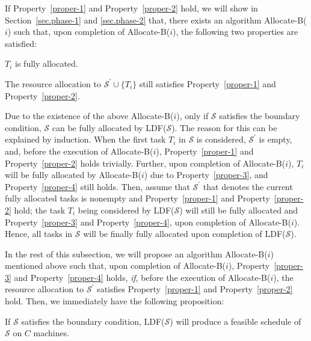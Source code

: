 \documentclass[10pt,journal,compsoc]{IEEEtran}
\begin{document}
If Property~\ref{proper-1} and Property~\ref{proper-2} hold, we will show in Section~\ref{sec.phase-1} and \ref{sec.phase-2} that, there exists an algorithm Allocate-B($i$) such that, upon completion of Allocate-B($i$), the following two properties are satisfied:

\begin{property}\label{proper-3}
$T_{i}$ is fully allocated.
\end{property}

\begin{property}\label{proper-4}
The resource allocation to $\mathcal{S}^{\prime}\cup\{T_{i}\}$ still satisfies Property~\ref{proper-1} and Property~\ref{proper-2}.
\end{property}
Due to the existence of the above Allocate-B($i$), only if $\mathcal{S}$ satisfies the boundary condition, $\mathcal{S}$ can be fully allocated by LDF($\mathcal{S}$). The reason for this can be explained by induction. When the first task $T_{i}$ in $\mathcal{S}$ is considered, $\mathcal{S}^{\prime}$ is empty, and, before the execution of Allocate-B($i$), Property~\ref{proper-1} and Property~\ref{proper-2} holds trivially. Further, upon completion of Allocate-B($i$), $T_{i}$ will be fully allocated by Allocate-B($i$) due to Property~\ref{proper-3}, and Property~\ref{proper-4} still holds. Then, assume that $\mathcal{S}^{\prime}$ that denotes the current fully allocated tasks is nonempty and Property~\ref{proper-1} and Property~\ref{proper-2} hold; the task $T_{i}$ being considered by LDF($\mathcal{S}$) will still be fully allocated and Property~\ref{proper-3} and Property~\ref{proper-4}, upon completion of Allocate-B($i$). Hence, all tasks in $\mathcal{S}$ will be finally fully allocated upon completion of LDF($\mathcal{S}$).



In the rest of this subsection, we will propose an algorithm Allocate-B($i$) mentioned above such that, upon completion of Allocate-B($i$), Property~\ref{proper-3} and Property~\ref{proper-4} holds, {\em if}, before the execution of Allocate-B($i$), the resource allocation to $\mathcal{S}^{\prime}$ satisfies Property~\ref{proper-1} and Property~\ref{proper-2} hold. Then, we immediately have the following proposition:
\begin{proposition}\label{property-task}
If $\mathcal{S}$ satisfies the boundary condition, LDF($\mathcal{S}$) will produce a feasible schedule of $\mathcal{S}$ on $C$ machines.
\end{proposition}
\end{document}
